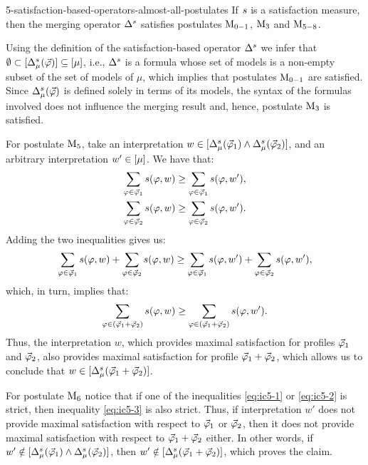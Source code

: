 \begin{prp}{}{5-satisfaction-based-operators-almost-all-postulates}
	If $\sat$ is a satisfaction measure, then 
	the 
	merging operator $\me^\sat$ 
	satisfies postulates $\ppm{0-1}$, $\ppm{3}$ and $\ppm{5-8}$. 
\end{prp}
\begin{prf*}{}{}%
	Using the definition of the satisfaction-based operator $\mer{\sat}{}$
	we infer that $\emptyset\subset\mods{\mer{\sat}{\mu}(\P)}\subseteq\mods{\mu}$,
	i.e., $\mer{\sat}{}$ is a formula whose set of models is a non-empty subset of the set of models of $\mu$,
	which implies that postulates $\ppm{0-1}$ are satisfied.
	Since $\mer{\sat}{\mu}(\P)$ is defined solely in terms of its models,
	the syntax of the formulas involved does not influence the merging result and, hence,
	postulate $\ppm{3}$ is satisfied.
	
	For postulate $\ppm{5}$, take an interpretation $w\in\mods{\mer{\sat}{\mu}(\P_1)\land\mer{\sat}{\mu}(\P_2)}$,
	and an arbitrary interpretation $w'\in\mods{\mu}$.
	We have that:
	\begin{align}
	\sum_{\phi\in\P_1}\sat(\phi,w)&\geq\sum_{\phi\in\P_1}\sat(\phi,w'),\label{eq:ic5-1}\\
	\sum_{\phi\in\P_2}\sat(\phi,w)&\geq\sum_{\phi\in\P_2}\sat(\phi,w').\label{eq:ic5-2}
	\end{align}
	Adding the two inequalities gives us:
	$$
	\sum_{\phi\in\P_1}\sat(\phi,w) + \sum_{\phi\in\P_2}\sat(\phi,w)\geq
	\sum_{\phi\in\P_1}\sat(\phi,w') + \sum_{\phi\in\P_2}\sat(\phi,w'),
	$$
	which, in turn, implies that:
	\begin{align}
	\sum_{\phi\in(\append{\P_1}{\P_2})}\sat(\phi,w)\geq\sum_{\phi\in(\append{\P_1}{\P_2})}\sat(\phi,w').
	\label{eq:ic5-3}
	\end{align}
	Thus, the interpretation $w$, which provides maximal satisfaction for profiles $\P_1$ and $\P_2$,
	also provides maximal satisfaction for profile $\append{\P_1}{\P_2}$,
	which allows us to conclude that $w\in\mods{\mer{\sat}{\mu}(\append{\P_1}{\P_2})}$.
	
	For postulate $\ppm{6}$
	notice that if one of the inequalities \ref{eq:ic5-1} or \ref{eq:ic5-2}
	is strict, then inequality \ref{eq:ic5-3} is also strict.
	Thus, if interpretation $w'$ does not provide maximal satisfaction with respect to 
	$\P_1$ or $\P_2$, then it does not provide maximal satisfaction with respect to $\append{\P_1}{\P_2}$ either.
	In other words, if $w'\notin\mods{\mer{\sat}{\mu}(\P_1)\land\mer{\sat}{\mu}(\P_2)}$,
	then $w'\notin\mods{\mer{\sat}{\mu}(\append{\P_1}{\P_2})}$,
	which proves the claim.
	

\end{prf*}
